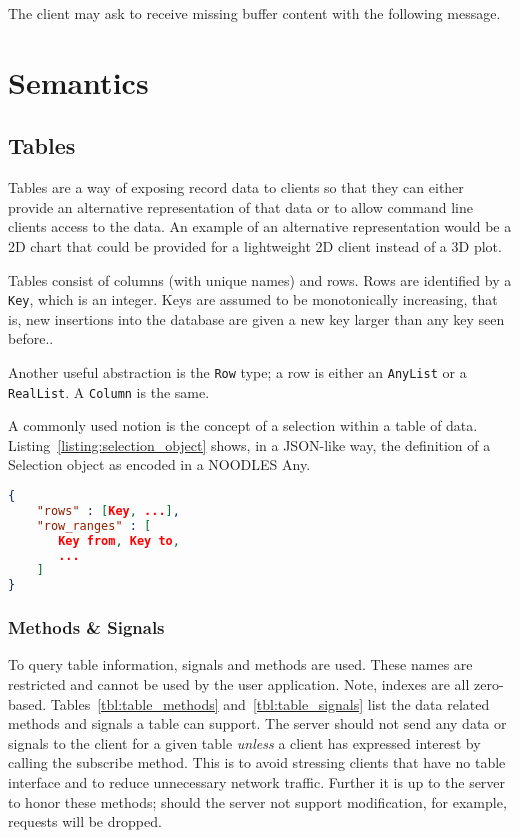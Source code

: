 \documentclass[11pt, oneside]{amsart}
\begin{document}
The client may ask to receive missing buffer content with the following message.




\section{Semantics}


\subsection{Tables}

Tables are a way of exposing record data to clients so that they can either provide an alternative representation of that data or to allow command line clients access to the data. An example of an alternative representation would be a 2D chart that could be provided for a lightweight 2D client instead of a 3D plot.

Tables consist of columns (with unique names) and rows. Rows are identified by a \texttt{Key}, which is an integer. Keys are assumed to be monotonically increasing, that is, new insertions into the database are given a new key larger than any key seen before..

Another useful abstraction is the \texttt{Row} type; a row is either an \texttt{AnyList} or a \texttt{RealList}. A \texttt{Column} is the same.

A commonly used notion is the concept of a selection within a table of data. Listing~\ref{listing:selection_object} shows, in a JSON-like way, the definition of a Selection object as encoded in a NOODLES Any.

\begin{lstlisting}[language=json, label=listing:selection_object, caption=Selection object definition. Note that the \texttt{to} field in the row ranges is exclusive. The \texttt{row\_ranges} list \textit{must} have an even number of elements. ]
{
	"rows" : [Key, ...],
	"row_ranges" : [
	   Key from, Key to,
	   ...
	]
}
\end{lstlisting}

\subsubsection{Methods \& Signals}

To query table information, signals and methods are used. These names are restricted and cannot be used by the user application. Note, indexes are all zero-based. Tables~\ref{tbl:table_methods} and~\ref{tbl:table_signals} list the data related methods and signals a table can support. The server should not send any data or signals to the client for a given table \emph{unless} a client has expressed interest by calling the subscribe method. This is to avoid stressing clients that have no table interface and to reduce unnecessary network traffic. Further it is up to the server to honor these methods; should the server not support modification, for example, requests will be dropped.
\end{document}
